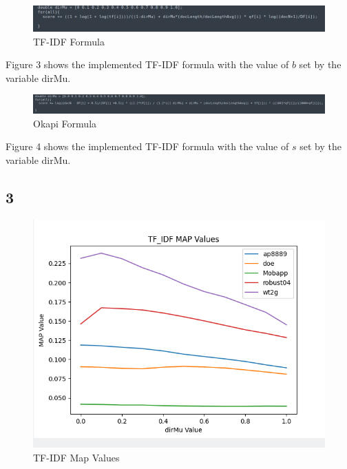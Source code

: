 \documentclass{article}
\begin{document}
\begin{figure}[h!]
\centering
\includegraphics[scale=0.45]{TF_IDF_FORMULA.png}
\caption{TF-IDF Formula}
\end{figure}

Figure 3 shows the implemented TF-IDF formula with the value of $b$ set by the variable dirMu.\\

\begin{figure}[h!]
\centering
\includegraphics[scale=0.35]{Okapi_FORMULA.png}
\caption{Okapi Formula}
\end{figure}

Figure 4 shows the implemented TF-IDF formula with the value of $s$ set by the variable dirMu.\\

\clearpage

\subsection*{3}
\begin{figure}[h!]
\centering
\includegraphics[scale=0.35]{TF_IDF_MAP_VALUES.png}
\caption{TF-IDF Map Values}
\end{figure}
\end{document}
